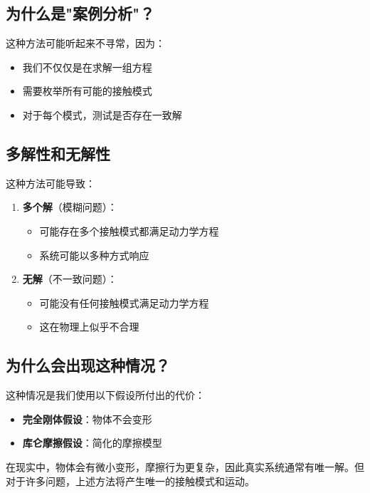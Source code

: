 \documentclass[12pt,a4paper]{article}
\begin{document}
\subsection{为什么是"案例分析"？}

这种方法可能听起来不寻常，因为：

\begin{itemize}
    \item 我们不仅仅是在求解一组方程
    \item 需要枚举所有可能的接触模式
    \item 对于每个模式，测试是否存在一致解
\end{itemize}

\subsection{多解性和无解性}

这种方法可能导致：

\begin{enumerate}
    \item \textbf{多个解}（模糊问题）：
    \begin{itemize}
        \item 可能存在多个接触模式都满足动力学方程
        \item 系统可能以多种方式响应
    \end{itemize}
    
    \item \textbf{无解}（不一致问题）：
    \begin{itemize}
        \item 可能没有任何接触模式满足动力学方程
        \item 这在物理上似乎不合理
    \end{itemize}
\end{enumerate}

\subsection{为什么会出现这种情况？}

这种情况是我们使用以下假设所付出的代价：

\begin{itemize}
    \item \textbf{完全刚体假设}：物体不会变形
    \item \textbf{库仑摩擦假设}：简化的摩擦模型
\end{itemize}

在现实中，物体会有微小变形，摩擦行为更复杂，因此真实系统通常有唯一解。但对于许多问题，上述方法将产生唯一的接触模式和运动。
\end{document}
